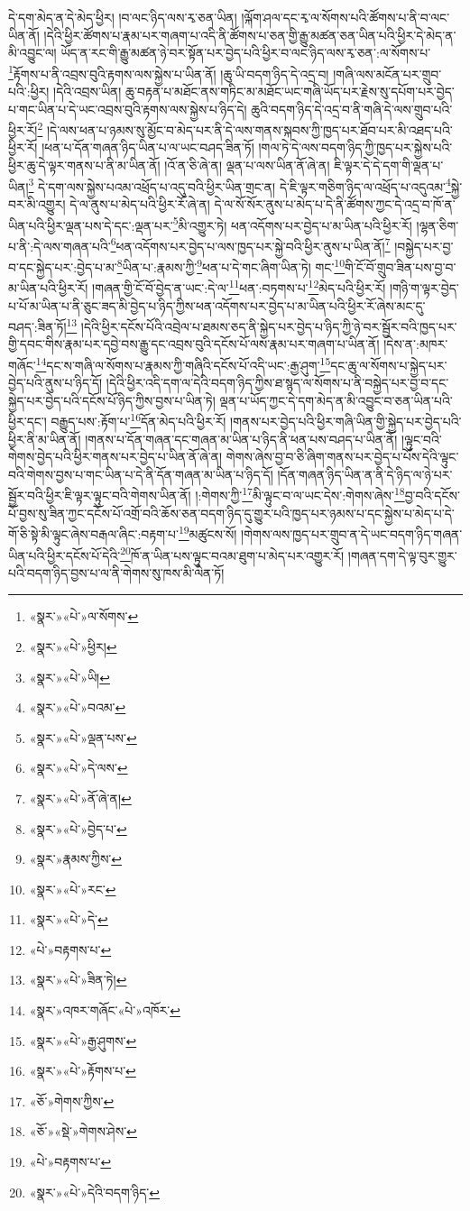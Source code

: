 དེ་དག་མེད་ན་དེ་མེད་ཕྱིར། །བ་ལང་ཉིད་ལས་རྭ་ཅན་ཡིན། །ལྐོག་ཤལ་དང་རྭ་ལ་སོགས་པའི་ཚོགས་པ་ནི་བ་ལང་ཡིན་ནོ། །དེའི་ཕྱིར་ཚོགས་པ་རྣམ་པར་གཞག་པ་འདི་ནི་ཚོགས་པ་ཅན་གྱི་རྒྱུ་མཚན་ཅན་ཡིན་པའི་ཕྱིར་དེ་མེད་ན་མི་འབྱུང་ལ། ཡོད་ན་རང་གི་རྒྱུ་མཚན་ཉེ་བར་སྟོན་པར་བྱེད་པའི་ཕྱིར་བ་ལང་ཉིད་ལས་རྭ་ཅན་:ལ་སོགས་པ་\footnote{«སྣར་»«པེ་»ལ་སོགས་}རྟོགས་པ་ནི་འབྲས་བུའི་རྟགས་ལས་སྐྱེས་པ་ཡིན་ནོ། །ཆུ་ཡི་བདག་ཉིད་དེ་འདྲ་བ། །གཞི་ལས་མངོན་པར་གྲུབ་པའི་:ཕྱིར། །དེའི་འབྲས་ཡིན། ཆུ་བརྟན་པ་མཐོང་ནས་གཏིང་མ་མཐོང་ཡང་གཞི་ཡོད་པར་རྗེས་སུ་དཔོག་པར་བྱེད་པ་གང་ཡིན་པ་དེ་ཡང་འབྲས་བུའི་རྟགས་ལས་སྐྱེས་པ་ཉིད་དེ། ཆུའི་བདག་ཉིད་དེ་འདྲ་བ་ནི་གཞི་དེ་ལས་གྲུབ་པའི་ཕྱིར་རོ།\footnote{«སྣར་»«པེ་»ཕྱིར།} །དེ་ལས་ཕན་པ་ཉམས་སུ་མྱོང་བ་མེད་པར་ནི་དེ་ལས་གནས་སྐབས་ཀྱི་ཁྱད་པར་ཐོབ་པར་མི་འཐད་པའི་ཕྱིར་རོ། །ཕན་པ་དོན་གཞན་ཉིད་ཡིན་པ་ལ་ཡང་བཤད་ཟིན་ཏོ། །གལ་ཏེ་དེ་ལས་བདག་ཉིད་ཀྱི་ཁྱད་པར་སྐྱེས་པའི་ཕྱིར་ཆུ་དེ་ལྟར་གནས་པ་ནི་མ་ཡིན་ནོ། །འོ་ན་ཅི་ཞེ་ན། ལྡན་པ་ལས་ཡིན་ནོ་ཞེ་ན། ཇི་ལྟར་དེ་དེ་དག་གི་ལྡན་པ་ཡིན།\footnote{«སྣར་»«པེ་»ཡི།} དེ་དག་ལས་སྐྱེས་པའམ་འཕྲོད་པ་འདུ་བའི་ཕྱིར་ཡིན་གྲང་ན། དེ་ཇི་ལྟར་གཅིག་ཉིད་ལ་འཕྲོད་པ་འདུའམ་\footnote{«སྣར་»«པེ་»བའམ་}སྐྱེ་བར་མི་འགྱུར། དེ་ལ་ནུས་པ་མེད་པའི་ཕྱིར་རོ་ཞེ་ན། དེ་ལ་སོ་སོར་ནུས་པ་མེད་པ་དེ་ནི་ཚོགས་ཀྱང་དེ་འདྲ་བ་ཁོ་ན་ཡིན་པའི་ཕྱིར་ལྡན་པས་དེ་དང་:ལྡན་པར་\footnote{«སྣར་»«པེ་»ལྡན་པས་}མི་འགྱུར་ཏེ། ཕན་འདོགས་པར་བྱེད་པ་མ་ཡིན་པའི་ཕྱིར་རོ། །ལྷན་ཅིག་པ་ནི་:དེ་ལས་གཞན་པའི་\footnote{«སྣར་»«པེ་»དེ་ལས་}ཕན་འདོགས་པར་བྱེད་པ་ལས་ཁྱད་པར་སྐྱེ་བའི་ཕྱིར་ནུས་པ་ཡིན་ནོ།\footnote{«སྣར་»«པེ་»ནོ་ཞེ་ན།} །བསྐྱེད་པར་བྱ་བ་དང་སྐྱེད་པར་:བྱེད་པ་མ་\footnote{«སྣར་»«པེ་»བྱེད་པ་}ཡིན་པ་:རྣམས་ཀྱི་\footnote{«སྣར་»རྣམས་ཀྱིས་}ཕན་པ་དེ་གང་ཞིག་ཡིན་ཏེ། གང་\footnote{«སྣར་»«པེ་»རང་}གི་ངོ་བོ་གྲུབ་ཟིན་པས་བྱ་བ་མ་ཡིན་པའི་ཕྱིར་རོ། །གཞན་གྱི་ངོ་བོ་བྱེད་ན་ཡང་:དེ་ལ་\footnote{«སྣར་»«པེ་»དེ་}ཕན་:བཏགས་པ་\footnote{«པེ་»བརྟགས་པ་}མེད་པའི་ཕྱིར་རོ། །གཉི་ག་ལྟར་བྱེད་པ་པོ་མ་ཡིན་པ་ནི་ཅུང་ཟད་མི་བྱེད་པ་ཉིད་ཀྱིས་ཕན་འདོགས་པར་བྱེད་པ་མ་ཡིན་པའི་ཕྱིར་རོ་ཞེས་མང་དུ་བཤད་:ཟིན་ཏོ།\footnote{«སྣར་»«པེ་»ཟིན་ཏེ།} །དེའི་ཕྱིར་དངོས་པོའི་འབྲེལ་པ་ཐམས་ཅད་ནི་སྐྱེད་པར་བྱེད་པ་ཉིད་ཀྱི་ཉེ་བར་སྦྱོར་བའི་ཁྱད་པར་གྱི་དབང་གིས་རྣམ་པར་དབྱེ་བས་རྒྱུ་དང་འབྲས་བུའི་དངོས་པོ་ལས་རྣམ་པར་གཞག་པ་ཡིན་ནོ། །དེས་ན་:མཁར་གཞོང་\footnote{«སྣར་»འཁར་གཞོང་«པེ་»འཁོར་}དང་ས་གཞི་ལ་སོགས་པ་རྣམས་ཀྱི་གཞིའི་དངོས་པོ་འདི་ཡང་:རྒྱ་ཤུག་\footnote{«སྣར་»«པེ་»རྒྱ་ཤུགས་}དང་ཆུ་ལ་སོགས་པ་སྐྱེད་པར་བྱེད་པའི་ནུས་པ་ཉིད་དོ། །དེའི་ཕྱིར་འདི་དག་ལ་དེའི་བདག་ཉིད་ཀྱིས་ཐ་སྙད་ལ་སོགས་པ་ནི་བསྐྱེད་པར་བྱ་བ་དང་སྐྱེད་པར་བྱེད་པའི་དངོས་པོ་ཉིད་ཀྱིས་བྱས་པ་ཡིན་ཏེ། ལྡན་པ་ཡོད་ཀྱང་དེ་དག་མེད་ན་མི་འབྱུང་བ་ཅན་ཡིན་པའི་ཕྱིར་དང་། བརྒྱུད་པས་:རྟོག་པ་\footnote{«སྣར་»«པེ་»རྟོགས་པ་}དོན་མེད་པའི་ཕྱིར་རོ། །གནས་པར་བྱེད་པའི་ཕྱིར་གཞི་ཡིན་གྱི་སྐྱེད་པར་བྱེད་པའི་ཕྱིར་ནི་མ་ཡིན་ནོ། །གནས་པ་དོན་གཞན་དང་གཞན་མ་ཡིན་པ་ཉིད་ནི་ཕན་པས་བཤད་པ་ཡིན་ནོ། །ལྟུང་བའི་གེགས་བྱེད་པའི་ཕྱིར་གནས་པར་བྱེད་པ་ཡིན་ནོ་ཞེ་ན། གེགས་ཞེས་བྱ་བ་ཅི་ཞིག་གནས་པར་བྱེད་པ་པོས་དེའི་ལྟུང་བའི་གེགས་བྱས་པ་གང་ཡིན་པ་དེ་ནི་དོན་གཞན་མ་ཡིན་པ་ཉིད་དོ། །དོན་གཞན་ཉིད་ཡིན་ན་ནི་དེ་ཉིད་ལ་ཉེ་པར་སྦྱོར་བའི་ཕྱིར་ཇི་ལྟར་ལྟུང་བའི་གེགས་ཡིན་ནོ། །:གེགས་ཀྱི་\footnote{«ཅོ་»གེགས་ཀྱིས་}མི་ལྟུང་བ་ལ་ཡང་དེས་:གེགས་ཞེས་\footnote{«ཅོ་»«སྡེ་»གེགས་ཤེས་}བྱ་བའི་དངོས་པོ་བྱས་སུ་ཟིན་ཀྱང་དངོས་པོ་འགྲོ་བའི་ཆོས་ཅན་བདག་ཉིད་དུ་གྱུར་པའི་ཁྱད་པར་ཉམས་པ་དང་སྐྱེས་པ་མེད་པ་དེ་གོ་ཅི་སྟེ་མི་ལྟུང་ཞེས་བརྒལ་ཞིང་:བརྟག་པ་\footnote{«པེ་»བརྟགས་པ་}མཚུངས་སོ། །གེགས་ལས་ཁྱད་པར་གྲུབ་ན་དེ་ཡང་བདག་ཉིད་གཞན་ཡིན་པའི་ཕྱིར་དངོས་པོ་དེའི་\footnote{«སྣར་»«པེ་»དེའི་བདག་ཉིད་}ཁོ་ན་ཡིན་པས་ལྟུང་བའམ་ཐུག་པ་མེད་པར་འགྱུར་རོ། །གཞན་དག་དེ་ལྟ་བུར་གྱུར་པའི་བདག་ཉིད་བྱས་པ་ལ་ནི་གེགས་སུ་ཁས་མི་ལེན་ཏོ། 